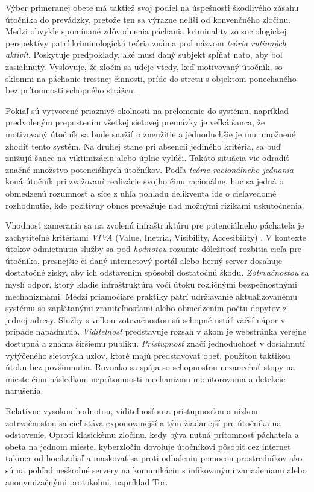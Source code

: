 \documentclass[12pt, a4paper]{article}
\begin{document}
Výber primeranej obete má taktiež svoj podiel na úspešnosti škodlivého zásahu útočníka do prevádzky,
pretože ten sa výrazne nelíši od konvenčného zločinu. Medzi obvykle spomínané zdôvodnenia páchania 
kriminality zo sociologickej perspektívy patrí kriminologická teória známa pod názvom 
\emph{teória rutinných aktivít}. Poskytuje predpoklady, aké musí daný subjekt spĺňať nato, aby bol 
zasiahnutý. Vyslovuje, že zločin sa udeje vtedy, keď motivovaný útočník, so sklonmi na páchanie trestnej 
činnosti, príde do stretu s objektom ponechaného bez prítomnosti schopného strážcu \cite{cohen-felson}.

Pokiaľ sú vytvorené priaznivé okolnosti na prelomenie do systému, napríklad predvoleným prepustením 
všetkej sieťovej premávky je veľká šanca, že motivovaný útočník sa bude snažiť o zneužitie a jednoduchšie
je mu umožnené zhodiť tento systém. Na druhej stane pri absencii jediného kritéria, sa buď znižujú šance na
viktimizáciu alebo úplne vylúči. Takáto situácia vie odradiť značné množstvo potenciálnych útočníkov.
Podľa \emph{teórie racionálneho jednania} koná útočník pri zvažovaní realizácie svojho činu racionálne,
hoc sa jedná o obmedzenú rozumnosť a síce z uhľa pohľadu delikventa ide o cieľavedomé rozhodnutie, kde 
pozitívny obnos prevažuje nad možnými rizikami uskutočnenia.

Vhodnosť zamerania sa na zvolenú infraštruktúru pre potenciálneho páchateľa je zachytiteľné kritériami 
\emph{VIVA} (Value, Inetria, Visibility, Accesibility) \cite{why-attack}. V kontexte útokov odmietnutia 
služby sa pod \emph{hodnotou} rozumie dôležitosť rozbitia cieľa pre útočníka, presnejšie či daný internetový 
portál alebo herný server dosahuje dostatočné zisky, aby ich odstavením spôsobil dostatočnú škodu. 
\emph{Zotrvačnosťou} sa myslí odpor, ktorý kladie infraštruktúra voči útoku rozličnými bezpečnostnými 
mechanizmami. Medzi priamočiare praktiky patrí udržiavanie aktualizovanému systému so zaplátanými 
zraniteľnosťami alebo obmedzením počtu dopytov z jednej adresy. Služby s veľkou zotrvačnosťou sú schopné 
ustáť väčší nápor v prípade napadnutia. \emph{Viditeľnosť} predstavuje rozsah v akom je webstránka verejne 
dostupná a známa širšiemu publiku. \emph{Prístupnosť} značí jednoduchosť v dosiahnutí vytýčeného sieťových 
uzlov, ktoré majú predstavovať obeť, použitou taktikou útoku bez povšimnutia. Rovnako sa spája so 
schopnosťou nezanechať stopy na mieste činu následkom neprítomnosti mechanizmu monitorovania a detekcie 
narušenia. 

Relatívne vysokou hodnotou, viditeľnosťou a prístupnosťou a nízkou zotrvačnosťou sa cieľ stáva 
exponovanejší a tým žiadanejší pre útočníka na odstavenie. Oproti klasickému zločinu, kedy býva nutná 
prítomnosť páchateľa a obeta na jednom mieste, kyberzločin dovoľuje útočníkovi pôsobiť cez internet takmer 
od hocikadiaľ a maskovať sa proti odhaleniu pomocou prostredníkov ako sú na pohľad neškodné servery na 
komunikáciu s infikovanými zariadeniami alebo anonymizačnými protokolmi, napríklad Tor.
\end{document}
